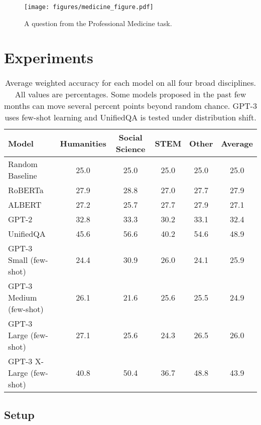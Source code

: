 \documentclass{article} \usepackage{iclr2021_conference, times}
\begin{document}
\begin{figure}[t]
    \centering
    \vspace{-15pt}
    \texttt{[image: figures/medicine\_figure.pdf]}
    \caption{A question from the Professional Medicine task.}
    \label{fig:other}
    \vspace{-15pt}
\end{figure} \section{Experiments}






\begin{table}[b]
\setlength{\tabcolsep}{9pt}
\vspace{-5pt}
\fontsize{10}{11}\selectfont
\centering
\begin{tabular}{lcccc|c}
Model       & Humanities & Social Science & STEM & Other &  Average \\
\hline
Random Baseline & 25.0 & 25.0 & 25.0 & 25.0 & 25.0 \\
RoBERTa           & 27.9 & 28.8 & 27.0 & 27.7 & 27.9 \\
ALBERT           & 27.2 & 25.7 & 27.7 & 27.9 & 27.1 \\
GPT-2           & 32.8 & 33.3 & 30.2 & 33.1 & 32.4 \\
UnifiedQA       & 45.6 & 56.6 & 40.2 & 54.6 & 48.9 \\
GPT-3 Small (few-shot)     & 24.4 & 30.9 & 26.0 & 24.1 & 25.9 \\
GPT-3 Medium (few-shot)   & 26.1 & 21.6 & 25.6 & 25.5 & 24.9 \\
GPT-3 Large (few-shot)     & 27.1 & 25.6 & 24.3 & 26.5 & 26.0 \\
GPT-3 X-Large (few-shot)   & 40.8 & 50.4 & 36.7 & 48.8 & 43.9 \\
\hline
\end{tabular}
\caption{Average weighted accuracy for each model on all four broad disciplines. All values are percentages. Some models proposed in the past few months can move several percent points beyond random chance. GPT-3 uses few-shot learning and UnifiedQA is tested under distribution shift.}
\label{tab:mainresults}
\end{table}


\subsection{Setup}
\end{document}
